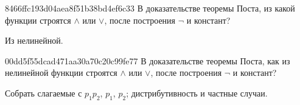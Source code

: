 \begin{note}{8466ffc193d04aea8f51b38bd4ef6c33}
    В доказательстве теоремы Поста, из какой функции строятся \({ \land }\) или \({ \lor }\), после построения \({ \lnot }\) и констант?

    \begin{cloze}{1}
        Из нелинейной.
    \end{cloze}
\end{note}

\begin{note}{00dd5f55dcad471aa30a70c20c99fe77}
    В доказательстве теоремы Поста, как из нелинейной функции строятся \({ \land }\) или \({ \lor }\), после построения \({ \lnot }\) и констант?

    \begin{cloze}{1}
        Собрать слагаемые с \({ p_1p_2 }\),\: \({ p_1 }\),\: \({ p_2 }\); дистрибутивность и частные случаи.
    \end{cloze}
\end{note}


